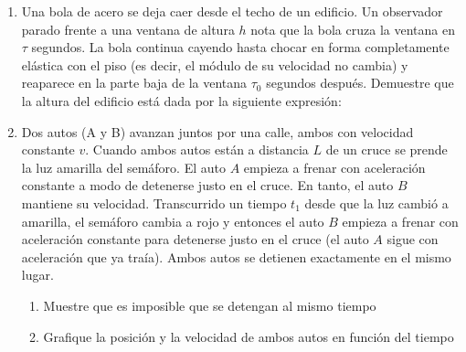 \documentclass[letterpaper,11pt]{article}
\begin{document}
\begin{enumerate}
\item
{
    \begin{multicols}{2}
        Una bola de acero se deja caer desde el techo de un edificio. Un observador parado frente a una ventana de altura $h$ nota que la bola cruza la ventana en $\tau$ segundos. La bola continua cayendo hasta chocar en forma completamente elástica con el piso (es decir, el módulo de su velocidad no cambia) y reaparece en la parte baja de la ventana $\tau_0$ segundos después. Demuestre que la altura del edificio está dada por la siguiente expresión:
        
        
        \columnbreak
        
        \begin{figure}[H]
            \centering
            
        \end{figure}
        
    \end{multicols}
}

\item Dos autos (A y B) avanzan juntos por una calle, ambos con velocidad constante $v$. Cuando ambos autos están a distancia $L$ de un cruce se prende la luz amarilla del semáforo. El auto $A$ empieza a frenar con aceleración constante a modo de detenerse justo en el cruce. En tanto, el auto $B$ mantiene su velocidad. Transcurrido un tiempo $t_1$ desde que la luz cambió a amarilla, el semáforo cambia a rojo y entonces el auto $B$ empieza a frenar con aceleración constante para detenerse justo en el cruce (el auto $A$ sigue con aceleración que ya traía). Ambos autos se detienen exactamente en el mismo lugar.

\begin{enumerate}
    \item Muestre que es imposible que se detengan al mismo tiempo
    
    \item Grafique la posición y la velocidad de ambos autos en función del tiempo
\end{enumerate}


\end{enumerate}
\end{document}
